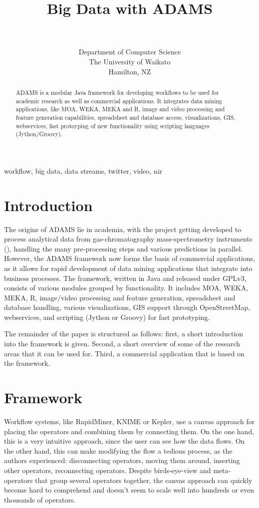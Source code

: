 \documentclass[wcp]{jmlr}
\title[Big Data with ADAMS]{Big Data with ADAMS}
\author{\Name{Peter Reutemann} \Email{fracpete@waikato.ac.nz} \\
  \Name{Geoff Holmes} \Email{geoff@waikato.ac.nz}\\
  \addr Department of Computer Science \\
  The University of Waikato \\
  Hamilton, NZ
 }
\begin{document}
\maketitle

\begin{abstract}
ADAMS is a modular Java framework for developing workflows to be used for
academic research as well as commercial applications. It integrates
data mining applications, like MOA, WEKA, MEKA and R, image and video
processing and feature generation capabilities, spreadsheet and database
access, visualizations, GIS, webservices, fast protoyping of new 
functionality using scripting languages (Jython/Groovy).
\end{abstract}
\begin{keywords}
workflow, big data, data streams, twitter, video, nir
\end{keywords}

\section{Introduction}
The origins of ADAMS lie in academia, with the project getting developed to process analytical data from gas-chromatography mass-spectrometry instruments (\cite{gcms}), handling the many pre-processing steps and various predictions in parallel. However, the ADAMS framework now forms the basis of commercial applications, as it allows for rapid development of data mining applications that integrate into business processes. The framework, written in Java and released under GPLv3, consists of various modules grouped by functionality. It includes MOA, WEKA, MEKA, R, image/video processing and feature generation, spreadsheet and database handling, various visualizations, GIS support through OpenStreetMap, webservices, and scripting (Jython or Groovy) for fast prototyping.

The remainder of the paper is structured as follows: first, a short introduction into the framework is given. Second, a short overview of some of the research areas that it can be used for. Third, a commercial application that is based on the framework.

\section{Framework}
Workflow systems, like RapidMiner, KNIME or Kepler, use a canvas approach for placing the operators and combining them by connecting them. On the one hand, this is a very intuitive approach, since the user can see how the data flows. On the other hand, this can make modifying the flow a tedious process, as the authors experienced: disconnecting operators, moving them around, inserting other operators, reconnecting operators. Despite birds-eye-view and meta-operators that group several operators together, the canvas approach can quickly become hard to comprehend and doesn't seem to scale well into hundreds or even thousands of operators.
\end{document}
